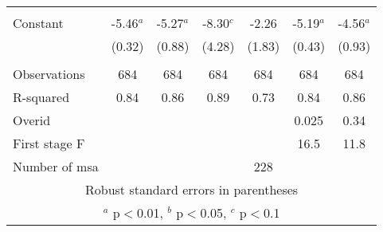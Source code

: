 \documentclass[]{article}
\begin{document}
\begin{tabular}{lcccccc}
 &  &  &  &  &  &  \\
Constant & -5.46$^a$ & -5.27$^a$ & -8.30$^c$ & -2.26 & -5.19$^a$ & -4.56$^a$ \\
 & (0.32) & (0.88) & (4.28) & (1.83) & (0.43) & (0.93) \\
 &  &  &  &  &  &  \\
Observations & 684 & 684 & 684 & 684 & 684 & 684 \\
R-squared & 0.84 & 0.86 & 0.89 & 0.73 & 0.84 & 0.86 \\
Overid &  &  &  &  & 0.025 & 0.34 \\
First stage F &  &  &  &  & 16.5 & 11.8 \\
 Number of msa &  &  &  & 228 &  &  \\ \hline
\multicolumn{7}{c}{ Robust standard errors in parentheses} \\
\multicolumn{7}{c}{ $^a$ p$<$0.01, $^b$ p$<$0.05, $^c$ p$<$0.1} \\
\end{tabular}
\end{document}
